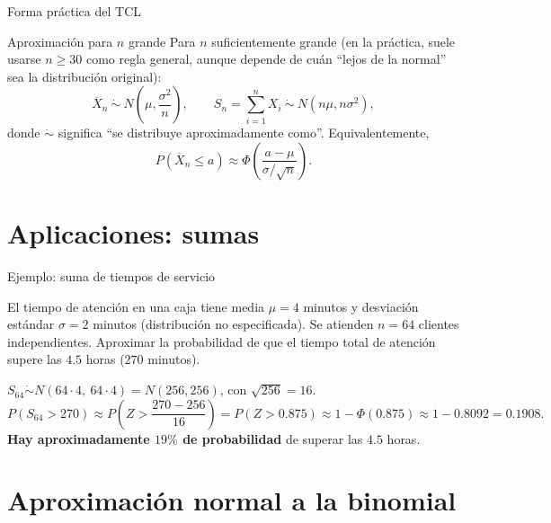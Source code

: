 \documentclass[aspectratio=169,11pt]{beamer}
\begin{document}
\begin{frame}{Forma práctica del TCL}
\begin{alertblock}{Aproximación para $n$ grande}
Para $n$ suficientemente grande (en la práctica, suele usarse $n\geq 30$ como regla general, aunque depende de cuán ``lejos de la normal'' sea la distribución original):
\[
\overline{X}_n \ \dot\sim\ N\left(\mu, \frac{\sigma^2}{n}\right), \qquad S_n = \sum_{i=1}^n X_i \ \dot\sim\ N(n\mu, n\sigma^2),
\]
donde $\dot\sim$ significa ``se distribuye aproximadamente como''. Equivalentemente,
\[
P(\overline X_n \leq a) \approx \Phi\left(\frac{a-\mu}{\sigma/\sqrt n}\right).
\]
\end{alertblock}
\end{frame}

\section{Aplicaciones: sumas}

\begin{frame}{Ejemplo: suma de tiempos de servicio}
\begin{example}
El tiempo de atención en una caja tiene media $\mu=4$ minutos y desviación estándar $\sigma=2$ minutos (distribución no especificada). Se atienden $n=64$ clientes independientes. Aproximar la probabilidad de que el tiempo total de atención supere las $4.5$ horas ($270$ minutos).
\end{example}

\medskip
$S_{64} \dot\sim N(64\cdot 4,\ 64\cdot 4) = N(256, 256)$, con $\sqrt{256}=16$.
\[
P(S_{64} > 270) \approx P\left(Z > \frac{270-256}{16}\right) = P(Z > 0.875) \approx 1-\Phi(0.875) \approx 1-0.8092 = 0.1908.
\]
\textbf{Hay aproximadamente $19\%$ de probabilidad} de superar las $4.5$ horas.
\end{frame}

\section{Aproximación normal a la binomial}
\end{document}
